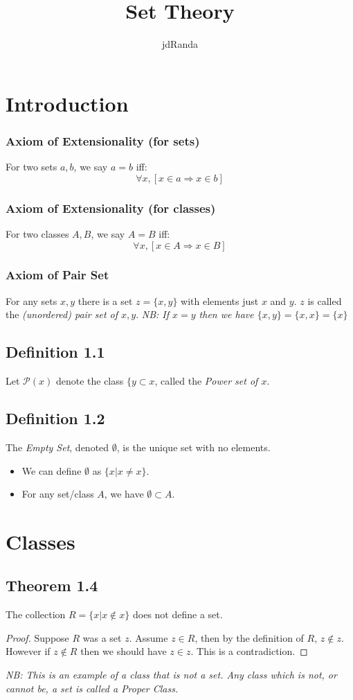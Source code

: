 \documentclass[a4paper, 12pt, twoside]{article}
\author{jdRanda}
\title{Set Theory}
\begin{document}
\maketitle
\newpage
\section{Introduction}
\subsubsection*{Axiom of Extensionality (for sets)}
For two sets $a,b$, we say $a=b$ iff:
$$ \forall x,[x\in a\Rightarrow x\in b]$$
\subsubsection*{Axiom of Extensionality (for classes)}
For two classes $A,B$, we say $A=B$ iff:
$$ \forall x,[x\in A\Rightarrow x\in B]$$
\subsubsection*{Axiom of Pair Set}
For any sets $x,y$ there is a set $z=\{x,y\}$ with elements just $x$ and $y$. $z$ is called the \emph{(unordered) pair set of $x,y$}.
\textit{NB: If $x=y$ then we have $\{x,y\}=\{x,x\}=\{x\}$}
\subsection*{Definition 1.1}
Let $\mathcal{P}(x)$ denote the class $\{y\subset x$, called the \emph{Power set of $x$}.
\subsection*{Definition 1.2}
The \emph{Empty Set}, denoted $\emptyset$, is the unique set with no elements.
\begin{itemize}
    \item We can define $\emptyset$ as $\{x|x\neq x\}$.
    \item For any set/class $A$, we have $\emptyset \subset A$.
\end{itemize}

\newpage
\section{Classes}
\subsection*{Theorem 1.4}
The collection $R=\{x|x\notin x\}$ does not define a set.\\
\begin{proof}
    Suppose $R$ was a set $z$. Assume $z\in R$, then by the definition of $R$, $z \notin z$. However if $z \notin R$ then we should have $z \in z$. This is a contradiction.
\end{proof}
\textit{NB: This is an example of a class that is not a set. Any class which is not, or cannot be, a set is called a \emph{Proper Class}.}
\end{document}
